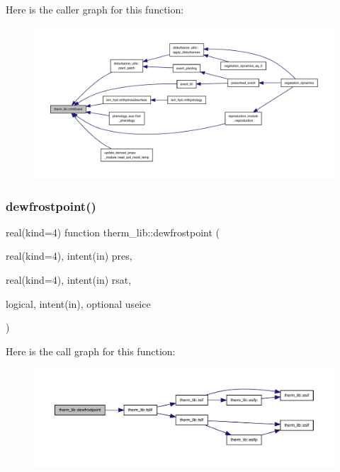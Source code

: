 Here is the caller graph for this function\+:
\nopagebreak
\begin{figure}[H]
\begin{center}
\leavevmode
\includegraphics[width=350pt]{namespacetherm__lib_a2db60e1f300fadcd09ef451059aa571b_icgraph}
\end{center}
\end{figure}
\mbox{\label{namespacetherm__lib_a0611d2fb3b39f0af58f3417bd88c43f0}} 
\subsubsection{\texorpdfstring{dewfrostpoint()}{dewfrostpoint()}}
{\footnotesize\ttfamily real(kind=4) function therm\+\_\+lib\+::dewfrostpoint (\begin{DoxyParamCaption}\item[{real(kind=4), intent(in)}]{pres,  }\item[{real(kind=4), intent(in)}]{rsat,  }\item[{logical, intent(in), optional}]{useice }\end{DoxyParamCaption})}

Here is the call graph for this function\+:
\nopagebreak
\begin{figure}[H]
\begin{center}
\leavevmode
\includegraphics[width=350pt]{namespacetherm__lib_a0611d2fb3b39f0af58f3417bd88c43f0_cgraph}
\end{center}
\end{figure}
\mbox{\label{namespacetherm__lib_a4a7268a45c9e0384a7711ec8b1d2b24e}} 

